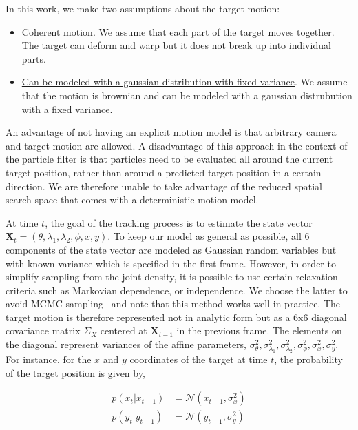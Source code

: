 In this work, we make two assumptions about the target motion:

\begin{itemize}
\item \underline{Coherent motion}.  We assume that each part of the target moves together.  The target can deform and warp but it does not break up into individual parts.
\item \underline{Can be modeled with a gaussian distribution with fixed variance}.  We assume that the motion is brownian and can be modeled with a gaussian distrubution with a fixed variance.  
\end{itemize}

An advantage of not having an explicit motion model is that arbitrary camera and target motion are allowed.  A disadvantage of this approach in the context of the particle filter is that particles need to be evaluated all around the current target position, rather than around a predicted target position in a certain direction.  We are therefore unable to take advantage of the reduced spatial search-space that comes with a deterministic motion model.  

At time $t$, the goal of the tracking process is to estimate the state vector $\mathbf{X}_t = (\theta, \lambda_1, \lambda_2, \phi, x, y)$.  To keep our model as general as possible, all 6 components of the state vector are modeled as Gaussian random variables but with known variance which is specified in the first frame.  However, in order to simplify sampling from the joint density, it is possible to use certain relaxation criteria such as Markovian dependence, or independence.  We choose the latter to avoid MCMC sampling~\cite{2009_BOOK_Bayes_Hoff} and note that this method works well in practice.  The target motion is therefore represented not in analytic form but as a 6x6 diagonal covariance matrix $\Sigma_X$ centered at $\mathbf{X}_{t-1}$ in the previous frame.  The elements on the diagonal represent variances of the affine parameters, $\sigma_\theta^2, \sigma_{\lambda_1}^2, \sigma_{\lambda_2}^2, \sigma_\phi^2, \sigma_x^2, \sigma_y^2$.  For instance, for the $x$ and $y$ coordinates of the target at time $t$, the probability of the target position is given by,

\begin{align}
p(x_t|x_{t-1}) &= \mathcal{N}(x_{t-1}, \sigma_x^2) \\
p(y_t|y_{t-1}) &= \mathcal{N}(y_{t-1}, \sigma_y^2)
\end{align}

